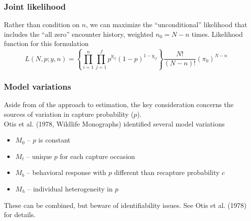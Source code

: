 \documentclass[color=usenames,dvipsnames]{beamer}\usepackage[]{graphicx}\usepackage[]{color}
\begin{document}
\begin{frame}
  \frametitle{Joint likelihood}
  \small
  Rather than condition on $n$, we can maximize the ``unconditional''
  likelihood that includes the ``all zero'' encounter history,
  weighted $n_0=N-n$ times. 
  \pause
  \vfill
  \flushleft
  Likelihood function for this formulation
  \begin{equation*}
    L(N,p; y,n) = \left\{\prod_{i=1}^n \prod_{j=1}^J p^{y_{ij}}(1-p)^{1-y_{ij}}\right\}
    \frac{N!}{(N-n)!}  \left(\pi_0\right)^{N-n}
  \end{equation*}
\end{frame}



\begin{frame}
  \frametitle{Model variations}
  Aside from of the approach to estimation, the key consideration
  concerns the sources of variation in capture probability ($p$). \\
  \pause
  \vfill
  Otis et al. (1978, Wildlife Monographs) identified several model variations
  \begin{itemize}
    \small
    \item $M_0$ -- $p$ is constant
    \item $M_t$ -- unique $p$ for each capture occasion
    \item $M_b$ -- behavioral response with $p$ different than
      recapture probability $c$
    \item $M_h$ -- individual heterogeneity in $p$
  \end{itemize}
  \pause \vfill
  These can be combined, but beware of identifiability issues. See
  Otis et al. (1978) for details. 
\end{frame}
\end{document}
